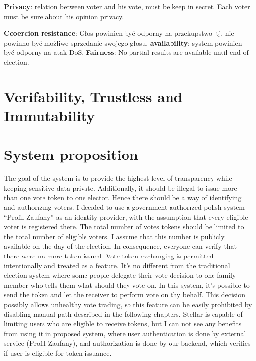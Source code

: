 \documentclass[runningheads]{llncs}
\begin{document}
\textbf{Privacy}: relation between voter and his vote, must be keep in secret. Each voter must be sure about his opinion privacy. 

\textbf{Ccoercion resistance}: Głos powinien być odporny na przekupstwo, tj. nie powinno być możliwe sprzedanie swojego głosu.
\textbf{availability}: system powinien być odporny na atak DoS.
\textbf{Fairness}: No partial results are available until end of election.



\section{Verifability, Trustless and Immutability}


\section{System proposition}

The goal of the system is to provide the highest level of transparency while keeping sensitive data private. Additionally, it should be illegal to issue more than one vote token to one elector. Hence there should be a way of identifying and authorizing voters. I decided to use a government authorized polish system
“Profil Zaufany” as an identity provider, with the assumption that every eligible voter is registered there. The total number of votes tokens should be limited to the total number of eligible voters. I assume that this number is publicly available on the day of the election. In consequence, everyone can verify that there were no more token issued. Vote token exchanging is permitted intentionally and treated as a feature. It’s no different from the traditional election system where some people delegate their vote decision to one family member who tells them what should they vote on. In this system, it’s possible to send the token and let the receiver to perform vote on thy behalf. This decision possibly allows unhealthy vote trading, so this feature can be easily prohibited by disabling manual path described in the following chapters. Stellar is capable of limiting users who are eligible to receive tokens, but I can not see any benefits from using it in proposed system, where user authentication is done by external service (Profil Zaufany), and authorization is done by our backend, which verifies if user is eligible for token issuance.
\end{document}
